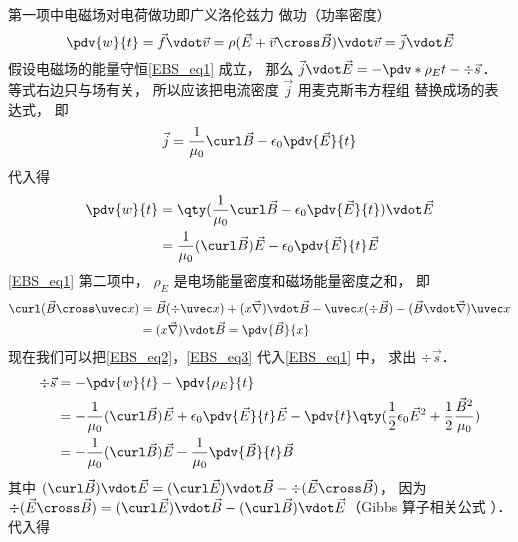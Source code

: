 第一项中电磁场对电荷做功即广义洛伦兹力%
做功（功率密度）
\begin{equation}
\pdv{w}{t} = \vec f \vdot \vec v = \rho (\vec E + \vec v \cross \vec B) \vdot \vec v = \vec j \vdot \vec E
\end{equation} 
假设电磁场的能量守恒\autoref{EBS_eq1} 成立， 那么 $\vec j \vdot \vec E =  - \pdv*{\rho_E}{t} - \div \vec s$． 等式右边只与场有关， 所以应该把电流密度 $\vec j$ 用麦克斯韦方程组%
替换成场的表达式， 即
\begin{equation}
\vec j = \frac{1}{\mu_0} \curl \vec B - \epsilon_0 \pdv{\vec E}{t}
\end{equation} 
代入得
\begin{equation}\label{EBS_eq2}
\begin{aligned}
\pdv{w}{t} &= \qty(\frac{1}{\mu_0} \curl \vec B - \epsilon_0 \pdv{\vec E}{t}) \vdot \vec E\\
&= \frac{1}{\mu_0} (\curl \vec B)\vec E - \epsilon_0 \pdv{\vec E}{t} \vec E
\end{aligned}
\end{equation} 
\autoref{EBS_eq1} 第二项中， $\rho_E$ 是电场能量密度和磁场能量密度之和， 即
\begin{equation}\label{EBS_eq3}
\begin{aligned}
\curl (\vec B \cross \uvec x) &= \vec B(\div \uvec x) + (x\vec\nabla) \vdot\vec B - \uvec x( \div \vec B) - (\vec B\vdot\vec\nabla)\uvec x \\
&= (x\vec\nabla)\vdot\vec B = \pdv{\vec B}{x}
\end{aligned}\end{equation} 
现在我们可以把\autoref{EBS_eq2}，\autoref{EBS_eq3} 代入\autoref{EBS_eq1} 中， 求出 $\div \vec s$． 
\begin{equation}
\begin{aligned}
\div \vec s &=  - \pdv{w}{t} - \pdv{\rho_E}{t}\\
&= -\frac{1}{\mu_0} (\curl \vec B)\vec E + \epsilon_0 \pdv{\vec E}{t} \vec E - \pdv{t} \qty( \frac12 \epsilon_0 \vec E^2 + \frac12 \frac{\vec B^2}{\mu_0} )\\
&=  - \frac{1}{\mu_0} (\curl \vec B)\vec E - \frac{1}{\mu_0} \pdv{\vec B}{t}\vec B
\end{aligned}
\end{equation} 
其中 $(\curl \vec B) \vdot \vec E = (\curl \vec E) \vdot \vec B - \div (\vec E \cross \vec B)$， 因为 $\div (\vec E \cross \vec B) = (\curl \vec E) \vdot \vec B - (\curl \vec B) \vdot \vec E$（Gibbs 算子相关公式%
）．代入得
